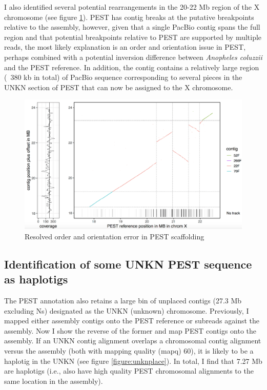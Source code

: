 \par{
I also identified several potential rearrangements in the 20-22 Mb region of the X chromosome (see figure \ref{figure:x_inversion}). PEST has contig breaks at the putative breakpoints relative to the assembly, however, given that a single PacBio contig spans the full region and that potential breakpoints relative to PEST are supported by multiple reads, the most likely explanation is an order and orientation issue in PEST, perhaps combined with a potential inversion difference between \textit{Anopheles coluzzii} and the PEST reference. In addition, the contig contains a relatively large region (~380 kb in total) of PacBio sequence corresponding to several pieces in the UNKN section of PEST that can now be assigned to the X chromosome.
}

\begin{figure}[htbp!]

\caption{Resolved order and orientation error in PEST scaffolding}
\label{figure:x_inversion}
\begin{centering}
\includegraphics[width=1.0\textwidth]{x_inversion.png}
\end{centering}
\end{figure}


\subsection{Identification of some UNKN PEST sequence as haplotigs}\label{section:unkn}

\par{
The PEST annotation also retains a large bin of unplaced contigs (27.3 Mb excluding Ns) designated as the UNKN (unknown) chromosome. Previously, I mapped either assembly contigs onto the PEST reference or subreads against the assembly. Now I show the reverse of the former and map PEST contigs onto the assembly. If an UNKN contig alignment overlaps a chromosomal contig alignment versus the assembly (both with mapping quality (mapq) 60), it is likely to be a haplotig in the UNKN (see figure \ref{figure:unknplace}). In total, I find that 7.27 Mb are haplotigs (i.e., also have high quality PEST chromosomal alignments to the same location in the assembly).
}

